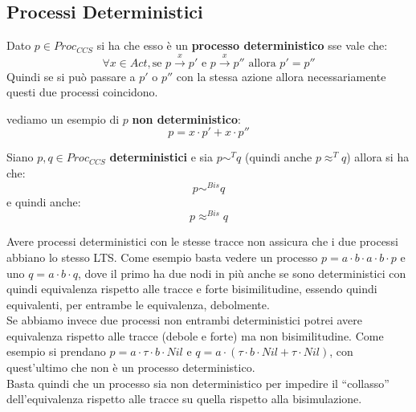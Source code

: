 \subsection{Processi Deterministici}
\begin{definizione}
  Dato $p\in Proc_{CCS}$ si ha che esso è un \textbf{processo deterministico}
  sse vale che:
  \[\forall x\in Act,\mbox{se } p\stackrel{x}{\rightarrow}p'\mbox{ e
    }p\stackrel{x}{\rightarrow}p''\mbox{ allora }p'=p''\]
  Quindi se si può passare a $p'$ o $p''$ con la stessa azione allora
  necessariamente questi due processi coincidono.
\end{definizione} \vspace{5mm} %
\begin{esempio}
  vediamo un esempio di $p$ \textbf{non deterministico}:
  \[p=x\cdot p'+x\cdot p''\]
\end{esempio}
\begin{definizione}
  Siano $p, q\in Proc_{CCS}$ \textbf{deterministici} e sia $p\sim^Tq$ (quindi
  anche $p\approx^Tq$) allora si ha che:
  \[p\sim^{Bis}q\]
  e quindi anche:
  \[p\approx^{Bis}q\]
\end{definizione} \vspace{5mm} %
Avere processi deterministici con le stesse tracce non assicura che i due
processi abbiano lo stesso LTS. Come esempio basta vedere un processo $p=a\cdot
b\cdot a\cdot b\cdot p$ e uno $q=a\cdot b\cdot q$, dove il primo ha due nodi in
più anche se sono deterministici con quindi equivalenza rispetto alle tracce e
forte bisimilitudine, essendo quindi equivalenti, per entrambe le equivalenza,
debolmente.\\ 
Se abbiamo invece due processi non entrambi deterministici potrei avere equivalenza
rispetto alle tracce (debole e forte) ma non bisimilitudine. Come esempio si
prendano $p=a\cdot \tau\cdot b\cdot Nil$ e $q=a\cdot(\tau\cdot b\cdot Nil+\tau
\cdot Nil)$, con quest'ultimo che non è un processo deterministico.\\
Basta quindi che un processo sia non deterministico per impedire il ``collasso''
dell'equivalenza rispetto alle tracce su quella rispetto alla bisimulazione.\\
